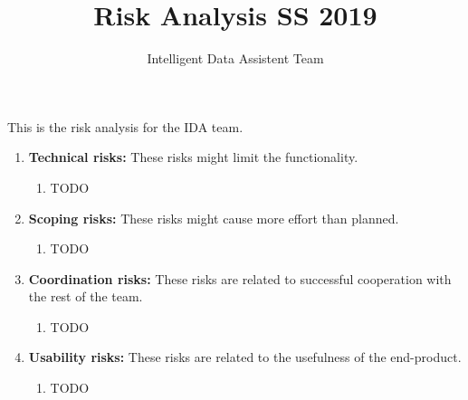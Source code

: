 \documentclass{llncs}
\begin{document}
\pagestyle{plain}

\title{Risk Analysis SS 2019}
\author{Intelligent Data Assistent Team}
\maketitle

This is the risk analysis for the IDA team.

\begin{enumerate}
	\item \textbf{Technical risks:} These risks might limit the functionality.
		\begin{enumerate}
			\item TODO
		\end{enumerate}
	\item \textbf{Scoping risks:} These risks might cause more effort than planned.
		\begin{enumerate}
			\item TODO
		\end{enumerate}
	\item \textbf{Coordination risks:} These risks are related to successful cooperation with the rest of the team.
		\begin{enumerate}
			\item TODO
		\end{enumerate}
	\item \textbf{Usability risks:} These risks are related to the usefulness of the end-product.
		\begin{enumerate}
			\item TODO
		\end{enumerate}
\end{enumerate}
\end{document}
